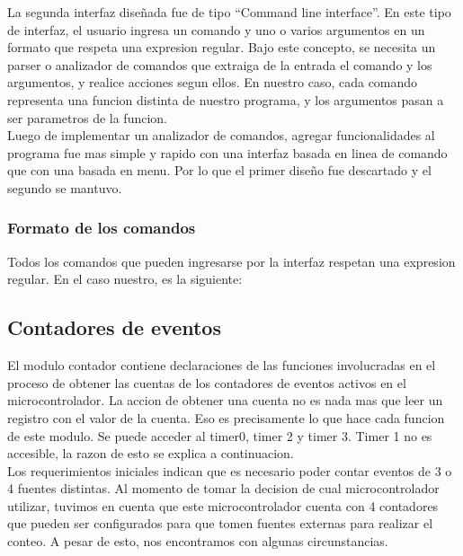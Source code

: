 La segunda interfaz diseñada fue de tipo ``Command line interface''. En este tipo de interfaz, el usuario ingresa un comando y uno o varios argumentos en un formato que respeta una expresion regular. Bajo este concepto, se necesita un parser o analizador de comandos que extraiga de la entrada el comando y los argumentos, y realice acciones segun ellos. En nuestro caso, cada comando representa una funcion distinta de nuestro programa, y los argumentos pasan a ser parametros de la funcion. \\

Luego de implementar un analizador de comandos, agregar funcionalidades al programa fue mas simple y rapido con una interfaz basada en linea de comando que con una basada en menu. Por lo que el primer diseño fue descartado y el segundo se mantuvo. \\

\subsubsection{Formato de los comandos} %
\label{ssub:formato_de_los_comandos}

Todos los comandos que pueden ingresarse por la interfaz respetan una expresion regular. En el caso nuestro, es la siguiente:





\subsection{Contadores de eventos} %
\label{sub:contadores_de_eventos}


El modulo contador contiene declaraciones de las funciones involucradas en el proceso de obtener las cuentas de los contadores de eventos activos en el microcontrolador. La accion de obtener una cuenta no es nada mas que leer un registro con el valor de la cuenta. Eso es precisamente lo que hace cada funcion de este modulo. Se puede acceder al timer0, timer 2 y timer 3. Timer 1 no es accesible, la razon de esto se explica a continuacion. \\

Los requerimientos iniciales indican que es necesario poder contar eventos de 3 o 4 fuentes distintas. Al momento de tomar la decision de cual microcontrolador utilizar, tuvimos en cuenta que este microcontrolador cuenta con 4 contadores que pueden ser configurados para que tomen fuentes externas para realizar el conteo. A pesar de esto, nos encontramos con algunas circunstancias. 

